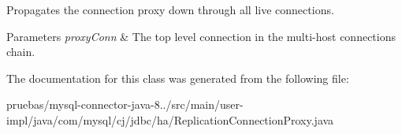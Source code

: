 Propagates the connection proxy down through all live connections.


\begin{DoxyParams}{Parameters}
{\em proxy\+Conn} & The top level connection in the multi-\/host connections chain. \\
\hline
\end{DoxyParams}


The documentation for this class was generated from the following file\+:\begin{DoxyCompactItemize}
\item 
pruebas/mysql-\/connector-\/java-\/8../src/main/user-\/impl/java/com/mysql/cj/jdbc/ha/Replication\+Connection\+Proxy.\+java\end{DoxyCompactItemize}

